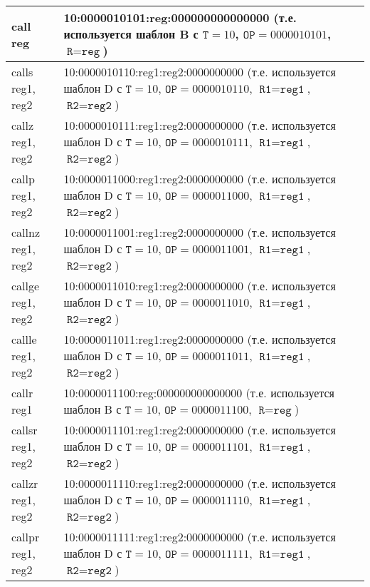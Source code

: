 \documentclass[10pt]{report}
\begin{document}
\begin{longtable}[c]{|l|p{12.5cm}|}
call reg                        & 10:0000010101:reg:000000000000000 (т.е. используется шаблон B с $\texttt{T}=10$,  $\texttt{OP}=0000010101$, $\texttt{R}=\texttt{reg}$) \\ \hline
calls reg1, reg2                & 10:0000010110:reg1:reg2:0000000000 (т.е. используется шаблон D с $\texttt{T}=10$, $\texttt{OP}=0000010110$, $\texttt{R1}=\texttt{reg1}$, $\texttt{R2}=\texttt{reg2}$) \\ \hline
callz reg1, reg2                & 10:0000010111:reg1:reg2:0000000000 (т.е. используется шаблон D с $\texttt{T}=10$, $\texttt{OP}=0000010111$, $\texttt{R1}=\texttt{reg1}$, $\texttt{R2}=\texttt{reg2}$) \\ \hline
callp reg1, reg2                & 10:0000011000:reg1:reg2:0000000000 (т.е. используется шаблон D с $\texttt{T}=10$, $\texttt{OP}=0000011000$, $\texttt{R1}=\texttt{reg1}$, $\texttt{R2}=\texttt{reg2}$) \\ \hline
callnz reg1, reg2               & 10:0000011001:reg1:reg2:0000000000 (т.е. используется шаблон D с $\texttt{T}=10$, $\texttt{OP}=0000011001$, $\texttt{R1}=\texttt{reg1}$, $\texttt{R2}=\texttt{reg2}$) \\ \hline
callge reg1, reg2               & 10:0000011010:reg1:reg2:0000000000 (т.е. используется шаблон D с $\texttt{T}=10$, $\texttt{OP}=0000011010$, $\texttt{R1}=\texttt{reg1}$, $\texttt{R2}=\texttt{reg2}$) \\ \hline
callle reg1, reg2               & 10:0000011011:reg1:reg2:0000000000 (т.е. используется шаблон D с $\texttt{T}=10$, $\texttt{OP}=0000011011$, $\texttt{R1}=\texttt{reg1}$, $\texttt{R2}=\texttt{reg2}$) \\ \hline
callr reg1                      & 10:0000011100:reg:000000000000000 (т.е. используется шаблон B с $\texttt{T}=10$,  $\texttt{OP}=0000011100$, $\texttt{R}=\texttt{reg}$) \\ \hline
callsr reg1, reg2               & 10:0000011101:reg1:reg2:0000000000 (т.е. используется шаблон D с $\texttt{T}=10$, $\texttt{OP}=0000011101$, $\texttt{R1}=\texttt{reg1}$, $\texttt{R2}=\texttt{reg2}$) \\ \hline
callzr reg1, reg2               & 10:0000011110:reg1:reg2:0000000000 (т.е. используется шаблон D с $\texttt{T}=10$, $\texttt{OP}=0000011110$, $\texttt{R1}=\texttt{reg1}$, $\texttt{R2}=\texttt{reg2}$) \\ \hline
callpr reg1, reg2               & 10:0000011111:reg1:reg2:0000000000 (т.е. используется шаблон D с $\texttt{T}=10$, $\texttt{OP}=0000011111$, $\texttt{R1}=\texttt{reg1}$, $\texttt{R2}=\texttt{reg2}$) \\ \hline

\end{longtable}
\end{document}
